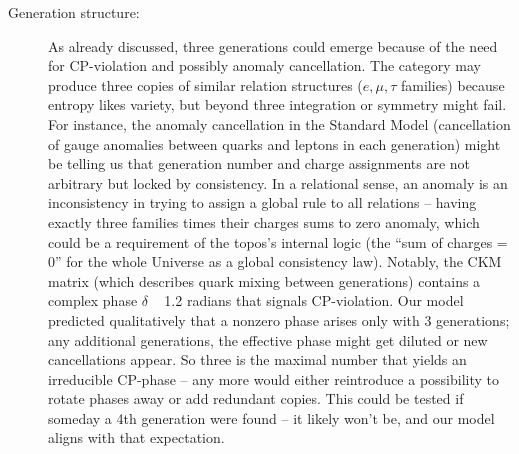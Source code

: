 \documentclass{article}
\begin{document}
\begin{description}
\item[Generation structure:] As already discussed, three generations could emerge because of the need for CP-violation and possibly anomaly cancellation. The category may produce three copies of similar relation structures ($e,\mu,\tau$ families) because entropy likes variety, but beyond three integration or symmetry might fail. For instance, the anomaly cancellation in the Standard Model (cancellation of gauge anomalies between quarks and leptons in each generation) might be telling us that generation number and charge assignments are not arbitrary but locked by consistency. In a relational sense, an anomaly is an inconsistency in trying to assign a global rule to all relations – having exactly three families times their charges sums to zero anomaly, which could be a requirement of the topos’s internal logic (the “sum of charges = 0” for the whole Universe as a global consistency law). Notably, the CKM matrix (which describes quark mixing between generations) contains a complex phase $\delta$ ~ 1.2 radians that signals CP-violation. Our model predicted qualitatively that a nonzero phase arises only with 3 generations; any additional generations, the effective phase might get diluted or new cancellations appear. So three is the maximal number that yields an irreducible CP-phase – any more would either reintroduce a possibility to rotate phases away or add redundant copies. This could be tested if someday a 4th generation were found – it likely won’t be, and our model aligns with that expectation.


\end{description}
\end{document}
